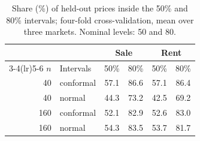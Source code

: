 \begin{table}[t]
\centering\small
\caption{Share (\%) of held-out prices inside the 50\% and 80\% intervals; four-fold cross-validation, mean over three markets. Nominal levels: 50 and 80.}
\label{tab:coverage}
\begin{tabular}{rlcccc}
\toprule
 & & \multicolumn{2}{c}{Sale} & \multicolumn{2}{c}{Rent} \\
\cmidrule(lr){3-4}\cmidrule(lr){5-6}
$n$ & Intervals & 50\% & 80\% & 50\% & 80\% \\
\midrule
40 & conformal & 57.1 & 86.6 & 57.1 & 86.4 \\
40 & normal & 44.3 & 73.2 & 42.5 & 69.2 \\
160 & conformal & 52.1 & 82.9 & 52.6 & 83.0 \\
160 & normal & 54.3 & 83.5 & 53.7 & 81.7 \\
\bottomrule
\end{tabular}
\end{table}
